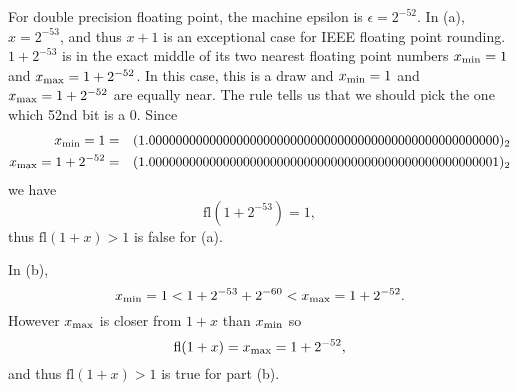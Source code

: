 \documentclass[pdftex,11pt]{article}
\begin{document}
For double precision floating point, the machine epsilon is $\epsilon =
2^{-52}$.  In (a), $x=2^{-53}$, and thus $x+1$ is an exceptional case for IEEE
floating point rounding. $1+2^{-53}$ is in the exact middle of its two nearest
floating point numbers $x_\textmd{min}=1$ and $x_\textmd{max}=1+2^{-52}$.
In this case, this is a draw and  $x_\textmd{min}=1$ and $x_\textmd{max}=1+2^{-52}$ are equally near.
The rule tells us that we should pick the one which 52nd bit is a 0. Since
\begin{eqnarray}
\nonumber x_\textmd{min}=1  &=&  (1.0000000000000000000000000000000000000000000000000000)_2 \\
\nonumber x_\textmd{max}=1+2^{-52} &=& (1.0000000000000000000000000000000000000000000000000001)_2 
\end{eqnarray}
we have 
\[ \mathrm{fl}(1+2^{-53}) = 1, \] 
thus
$\mathrm{fl}(1+x)>1$ is false for (a).

In (b), 
$$ x_\textmd{min}= 1 < 1+ 2^{-53}+2^{-60} < x_\textmd{max}=1+2^{-52}. $$
However $x_\textmd{max}$ is closer from $1+x$ than  $x_\textmd{min}$ so
$$\mathrm{fl}(1+x)=x_\textmd{max}=1+2^{-52},$$
and
thus $\mathrm{fl}(1+x)>1$ is true for part (b).
\end{document}
